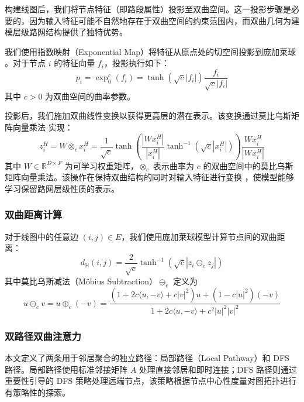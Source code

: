 构建线图后，我们将节点特征（即路段属性）投影至双曲空间。这一投影步骤是必要的，因为输入特征可能不自然地存在于双曲空间的约束范围内，而双曲几何为建模层级路网结构提供了独特优势。

我们使用指数映射（Exponential Map）将特征从原点处的切空间投影到庞加莱球 \cite{Mathieu2019}。对于节点 $i$ 的特征向量 $f_i$，投影执行如下：
\begin{equation}
p_i = \exp_0^c(f_i) = \tanh(\sqrt{c}|f_i|)\frac{f_i}{\sqrt{c}|f_i|}
\label{eq:exp_map}
\end{equation}
其中 $c > 0$ 为双曲空间的曲率参数。

投影后，我们施加双曲线性变换以获得更高层的潜在表示。该变换通过莫比乌斯矩阵向量乘法 \cite{Ganea2018} 实现：
\begin{equation}
z_i^H = W \otimes_c x_i^H = \frac{1}{\sqrt{c}}\tanh\left(\frac{|Wx_i^H|}{|x_i^H|}\tanh^{-1}(\sqrt{c}|x_i^H|)\right)\frac{Wx_i^H}{|Wx_i^H|}
\label{eq:mobius_matvec}
\end{equation}
其中 $W \in \mathbb{R}^{D \times F}$ 为可学习权重矩阵，$\otimes_c$ 表示曲率为 $c$ 的双曲空间中的莫比乌斯矩阵向量乘法。该操作在保持双曲结构的同时对输入特征进行变换 \cite{Chami2019}，使模型能够学习保留路网层级性质的表示。

\subsubsection{双曲距离计算}

对于线图中的任意边 $(i,j) \in E$，我们使用庞加莱球模型计算节点间的双曲距离：
\begin{equation}
d_{\mathbb{H}}(i,j) = \frac{2}{\sqrt{c}}\tanh^{-1}\left(\sqrt{c}|z_i \ominus_c z_j|\right)
\label{eq:hyperbolic_distance}
\end{equation}
其中莫比乌斯减法（M\"obius Subtraction）$\ominus_c$ 定义为
\begin{equation}
u \ominus_c v = u \oplus_c (-v) = \frac{(1 + 2c\langle u,-v\rangle + c|v|^2)u + (1 - c|u|^2)(-v)}{1 + 2c\langle u,-v\rangle + c^2|u|^2|v|^2}
\label{eq:mobius_subtraction}
\end{equation}

\subsubsection{双路径双曲注意力}

本文定义了两条用于邻居聚合的独立路径：局部路径（Local Pathway）和 DFS 路径。局部路径使用标准邻接矩阵 $A$ 处理直接邻居和即时连接；DFS 路径则通过重要性引导的 DFS 策略处理远端节点，该策略根据节点中心性度量对图拓扑进行有策略性的探索。


